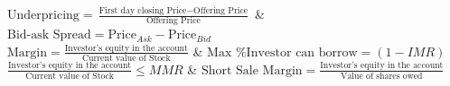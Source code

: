 $\text{Underpricing} = \frac{\text{First day closing Price} - \text{Offering Price}}{\text{Offering Price}}$ & $\text{Bid-ask Spread} = \text{Price}_{Ask} - \text{Price}_{Bid}$ \\

$\text{Margin} = \frac{\text{Investor's equity in the account}}{\text{Current value of Stock}}$ & $\text{Max \% Investor can borrow} = (1 - IMR)$ \\

$\frac{\text{Investor's equity in the account}}{\text{Current value of Stock}} \leq MMR$ & $\text{Short Sale Margin} = \frac{\text{Investor's equity in the account}}{\text{Value of shares owed}}$ \\
